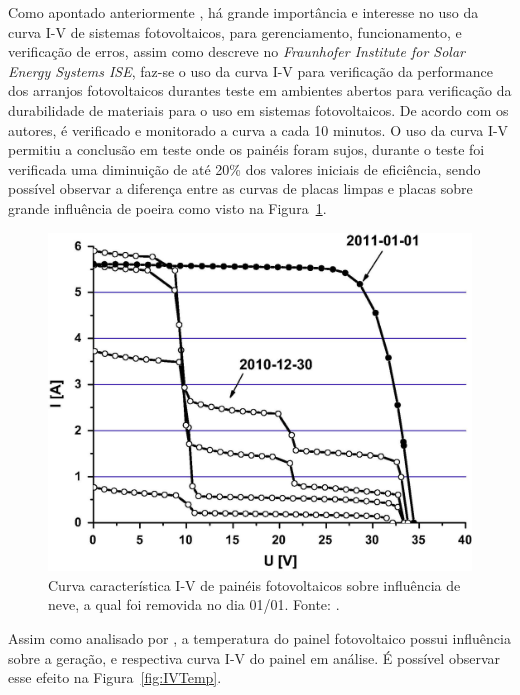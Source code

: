 Como apontado anteriormente , há grande importância e interesse no uso da curva I-V de sistemas fotovoltaicos, para gerenciamento, funcionamento, e verificação de erros, assim como descreve  no \textit{Fraunhofer Institute for Solar Energy Systems ISE}, faz-se o uso da curva I-V para verificação da performance dos arranjos fotovoltaicos durantes teste em ambientes abertos para verificação da durabilidade de materiais para o uso em sistemas fotovoltaicos. De acordo com os autores, é verificado e monitorado a curva a cada 10 minutos. O uso da curva I-V permitiu a conclusão em teste onde os painéis foram sujos, durante o teste foi verificada uma diminuição de até 20\% dos valores iniciais de eficiência, sendo possível observar a diferença entre as curvas de placas limpas e placas sobre grande influência de poeira como visto na Figura~\ref{fig:CurvaIVNeve}.

\FloatBarrier
\begin{figure}[!htbp]
	\centering
	\includegraphics[scale=1.5]{imagens/IxV_schill}
	\caption{Curva característica I-V de painéis fotovoltaicos sobre influência de neve, a qual foi removida no dia 01/01. Fonte: . }

	\label{fig:CurvaIVNeve}
\end{figure}
\FloatBarrier

Assim como analisado por  , a temperatura do painel fotovoltaico possui influência sobre a geração, e respectiva curva I-V do painel em análise. É possível observar esse efeito na Figura~\ref{fig:IVTemp}.

